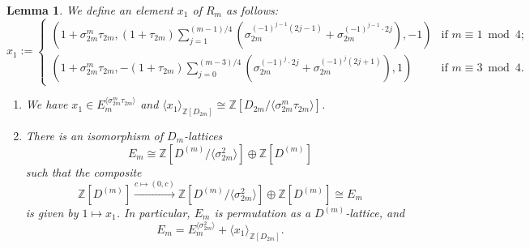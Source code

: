 \documentclass[12pt]{amsart}
\theoremstyle{plain}
\newtheorem{lem}[thm]{Lemma}
\theoremstyle{definition}
\numberwithin{thm}{section}
\numberwithin{equation}{section}
\newcommand{\Z}{\mathbb{Z}}
\begin{document}
\begin{lem}\label{lem:rsdg}
We define an element $x_{1}$ of $R_{m}$ as follows: 
\begin{equation*}
x_{1}:=
\begin{cases}
\left(1+\sigma_{2m}^{m}\tau_{2m},(1+\tau_{2m})\sum_{j=1}^{(m-1)/4}(\sigma_{2m}^{(-1)^{j-1}(2j-1)}+\sigma_{2m}^{(-1)^{j-1}\cdot 2j}),-1\right)&\text{if }m\equiv 1\bmod 4;\\
\left(1+\sigma_{2m}^{m}\tau_{2m},-(1+\tau_{2m})\sum_{j=0}^{(m-3)/4}(\sigma_{2m}^{(-1)^{j}\cdot 2j}+\sigma_{2m}^{(-1)^{j}(2j+1)}),1\right)&\text{if }m\equiv 3\bmod 4. 
\end{cases}
\end{equation*}
\begin{enumerate}
\item We have $x_{1}\in E_{m}^{\langle \sigma_{2m}^{m}\tau_{2m} \rangle}$ and $\langle x_{1}\rangle_{\Z[D_{2m}]}\cong \Z[D_{2m}/\langle \sigma_{2m}^{m}\tau_{2m} \rangle]$. 
\item There is an isomorphism of $D_{m}$-lattices
\begin{equation*}
E_{m}\cong \Z[D^{(m)}/\langle \sigma_{2m}^{2}\rangle]\oplus \Z[D^{(m)}]
\end{equation*}
such that the composite
\begin{equation*}
\Z[D^{(m)}]\xrightarrow{c\mapsto (0,c)} \Z[D^{(m)}/\langle \sigma_{2m}^{2}\rangle]\oplus \Z[D^{(m)}]\cong E_{m}
\end{equation*}
is given by $1\mapsto x_{1}$. In particular, $E_{m}$ is permutation as a $D^{(m)}$-lattice, and 
\begin{equation*}
E_{m}=E_{m}^{\langle \sigma_{2m}^{2}\rangle}+\langle x_{1}\rangle_{\Z[D_{2m}]}. 
\end{equation*}
\end{enumerate}
\end{lem}
\end{document}

